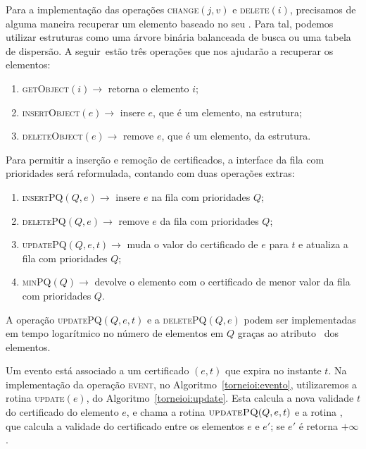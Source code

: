 Para a implementação das operações \textsc{change}$(j, v)$ e \textsc{delete}$(i)$, precisamos de
alguma maneira recuperar um elemento baseado no seu \id.
Para tal, podemos utilizar estruturas como uma árvore binária balanceada de busca ou uma tabela de
dispersão.
A seguir~estão três operações que nos ajudarão a recuperar os elementos:
\begin{enumerate}
    \item \textsc{getObject}$(i)\rightarrow$ retorna o elemento $i$;
    \item \textsc{insertObject}$(e) \rightarrow$ insere $e$, que é
    um elemento, na estrutura;
    \item \textsc{deleteObject}$(e) \rightarrow$ remove $e$, que é
    um elemento, da estrutura.
\end{enumerate}
Para permitir a inserção e remoção de certificados, a interface da fila com prioridades será
reformulada, contando com duas operações extras:
\begin{enumerate}
    \item \textsc{insertPQ}$(Q, e) \rightarrow$ insere $e$ na fila
    com prioridades $Q$;
    \item \textsc{deletePQ}$(Q, e) \rightarrow$ remove $e$ da fila
    com prioridades $Q$;
    \item \textsc{updatePQ}$(Q,e,t) \rightarrow$ muda o valor do
    certificado de $e$ para $t$ e atualiza a fila com prioridades
    $Q$;
    \item \textsc{minPQ}$(Q) \rightarrow$ devolve o elemento com o
    certificado de menor valor da fila com prioridades $Q$.
\end{enumerate}
A operação \textsc{updatePQ}$(Q,e,t)$ e a \textsc{deletePQ}$(Q, e)$ podem ser implementadas em
tempo logarítmico no número de elementos em $Q$ graças ao atributo \pqpos~dos elementos.

Um evento está associado a um certificado $(e, t)$ que expira no instante $t$.
Na implementação da operação \textsc{event}, no Algoritmo~\ref{torneioi:evento}, utilizaremos a
rotina \textsc{update}$(e)$, do Algoritmo~\ref{torneioi:update}.
Esta calcula a nova validade $t$ do certificado do elemento $e$, e chama a rotina
$\textsc{updatePQ}(Q, e, t)$ e a rotina , que calcula a validade do
certificado entre os elementos $e$ e $e'$; se $e'$ é \null retorna $+\infty$.





